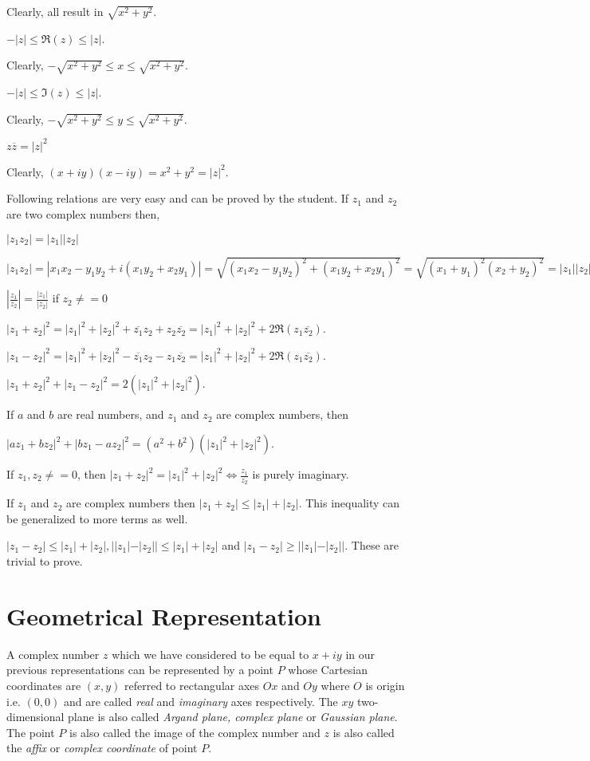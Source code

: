   Clearly, all result in $\sqrt{x^2 + y^2}$.
\item $-|z| \leq \Re(z) \leq |z|$.

  Clearly, $-\sqrt{x^2 + y^2}\leq x\leq \sqrt{x^2 + y^2}$.
\item $-|z| \leq \Im(z) \leq |z|$.

  Clearly, $-\sqrt{x^2 + y^2}\leq y\leq \sqrt{x^2 + y^2}$.
\item $z\overline{z} = |z|^2$

  Clearly, $(x + iy)(x - iy) = x^2 + y^2 = |z|^2.$
\stopitemize

\noindent Following relations are very easy and can be proved by the student. If $z_1$ and $z_2$ are two complex numbers then,

\startitemize[n,continue]
\item $|z_1z_2| = |z_1||z_2|$

  $|z_1z_2| = |x_1x_2 - y_1y_2 + i(x_1y_2 + x_2y_1)| = \sqrt{(x_1x_2 - y_1y_2)^2 + (x_1y_2 + x_2y_1)^2} = \sqrt{(x_1 + y_1)^2(x_2 +
  y_2)^2} = |z_1||z_2|$
\item $\left|\frac{z_1}{z_2}\right| = \frac{|z_1|}{|z_2|}$ if $z_2\neq = 0$
\item $|z_1 + z_2|^2 = |z_1|^2 + |z_2|^2 + \overline{z_1}z_2 + z_2\overline{z_2} = |z_1|^2 + |z_2|^2 + 2\Re(z_1\overline{z_2})$.
\item $|z_1 - z_2|^2 = |z_1|^2 + |z_2|^2 - \overline{z_1}z_2 - z_1\overline{z_2} = |z_1|^2 + |z_2|^2 + 2\Re(z_1\overline{z_2})$.
\item $|z_1 + z_2|^2 + |z_1 - z_2|^2 = 2\left(|z_1|^2 + |z_2|^2\right)$.
\item If $a$ and $b$ are real numbers, and $z_1$ and $z_2$ are complex numbers, then

  $|az_1 + bz_2|^2 + |bz_1 - az_2|^2 = (a^2 + b^2)\left(|z_1|^2 + |z_2|^2\right)$.
\item If $z_1, z_2\neq = 0$, then $|z_1 + z_2|^2 = |z_1|^2 + |z_2|^2 \Leftrightarrow \frac{z_1}{z_2}$ is purely imaginary.
\item If $z_1$ and $z_2$ are complex numbers then $|z_1 + z_2| \leq |z_1| + |z_2|$. This inequality can be generalized to more
  terms as well.
\item $|z_1 - z_2| \leq |z_1| + |z_2|, ||z_1| - |z_2||\leq |z_1| + |z_2|$ and $|z_1 - z_2|\geq ||z_1| - |z_2||$. These are trivial
  to prove.
\stopitemize

\section{Geometrical Representation}
A complex number $z$ which we have considered to be equal to $x+iy$ in our previous representations can be represented by a point
$P$ whose Cartesian coordinates are $(x,y)$ referred to rectangular axes $Ox$ and $Oy$ where $O$ is origin i.e. $(0, 0)$ and are
called {\it real} and {\it imaginary} axes respectively. The $xy$ two-dimensional plane is also called {\it Argand plane,
complex plane} or {\it Gaussian plane}. The point $P$ is also called the image of the complex number and $z$ is also called
the {\it affix} or {\it complex coordinate} of point $P$.

